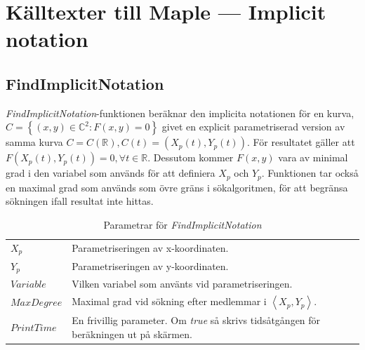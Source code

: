 \chapter[Källtexter --- Implicit notation]{Källtexter till Maple --- Implicit notation}
\label{FindImplicitNotation}

\section{FindImplicitNotation}

\emph{FindImplicitNotation}-funktionen beräknar den implicita notationen för en kurva, $C=\left\{(x,y)\in \mathbb{C}^2 : F(x,y)=0\right\}$ givet en explicit parametriserad version av samma kurva $C=C(\mathbb{R}), C(t)=(X_p(t),Y_p(t))$. För resultatet gäller att $F(X_p(t),Y_p(t))=0, \forall t \in \mathbb{R}$. Dessutom kommer $F(x,y)$ vara av minimal grad i den variabel som används för att definiera $X_p$ och $Y_p$. Funktionen tar också en maximal grad som används som övre gräns i sökalgoritmen, för att begränsa sökningen ifall resultat inte hittas.

\begin{table}[h]
\caption{Parametrar för \emph{FindImplicitNotation}}
\begin{center}
\begin{tabular}{|l|p{9cm}|}
\hline
$X_p$ & Parametriseringen av x-koordinaten. \\
$Y_p$ & Parametriseringen av y-koordinaten. \\
$Variable$ & Vilken variabel som använts vid parametriseringen.\\
$MaxDegree$ & Maximal grad vid sökning efter medlemmar i $\left<X_p , Y_p\right>$.\\
$PrintTime$ & En frivillig parameter. Om \emph{true} så skrivs tidsåtgången för beräkningen ut på skärmen.\\
\hline
\end{tabular}
\end{center}
\end{table}

